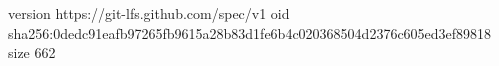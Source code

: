 version https://git-lfs.github.com/spec/v1
oid sha256:0dedc91eafb97265fb9615a28b83d1fe6b4c020368504d2376c605ed3ef89818
size 662
